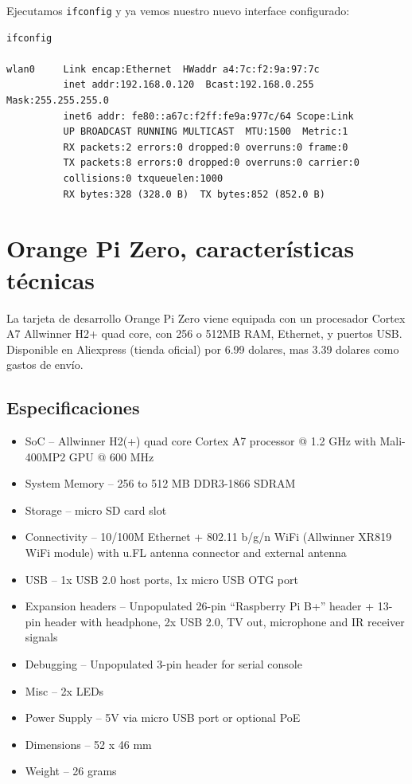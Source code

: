 \documentclass[12pt,spanish,]{scrartcl}
\providecommand{\tightlist}{%
  \setlength{\itemsep}{0pt}\setlength{\parskip}{0pt}}
\begin{document}
Ejecutamos \texttt{ifconfig} y ya vemos nuestro nuevo interface
configurado:

\begin{verbatim}
ifconfig

wlan0     Link encap:Ethernet  HWaddr a4:7c:f2:9a:97:7c
          inet addr:192.168.0.120  Bcast:192.168.0.255  Mask:255.255.255.0
          inet6 addr: fe80::a67c:f2ff:fe9a:977c/64 Scope:Link
          UP BROADCAST RUNNING MULTICAST  MTU:1500  Metric:1
          RX packets:2 errors:0 dropped:0 overruns:0 frame:0
          TX packets:8 errors:0 dropped:0 overruns:0 carrier:0
          collisions:0 txqueuelen:1000
          RX bytes:328 (328.0 B)  TX bytes:852 (852.0 B)
\end{verbatim}

\section{Orange Pi Zero, características
técnicas}\label{orange-pi-zero-caracteruxedsticas-tuxe9cnicas}

La tarjeta de desarrollo Orange Pi Zero viene equipada con un procesador
Cortex A7 Allwinner H2+ quad core, con 256 o 512MB RAM, Ethernet, y
puertos USB. Disponible en Aliexpress (tienda oficial) por 6.99 dolares,
mas 3.39 dolares como gastos de envío.

\subsection{Especificaciones}\label{especificaciones}

\begin{itemize}
\tightlist
\item
  SoC -- Allwinner H2(+) quad core Cortex A7 processor @ 1.2 GHz with
  Mali-400MP2 GPU @ 600 MHz
\item
  System Memory -- 256 to 512 MB DDR3-1866 SDRAM
\item
  Storage -- micro SD card slot
\item
  Connectivity -- 10/100M Ethernet + 802.11 b/g/n WiFi (Allwinner XR819
  WiFi module) with u.FL antenna connector and external antenna
\item
  USB -- 1x USB 2.0 host ports, 1x micro USB OTG port
\item
  Expansion headers -- Unpopulated 26-pin ``Raspberry Pi B+'' header +
  13-pin header with headphone, 2x USB 2.0, TV out, microphone and IR
  receiver signals
\item
  Debugging -- Unpopulated 3-pin header for serial console
\item
  Misc -- 2x LEDs
\item
  Power Supply -- 5V via micro USB port or optional PoE
\item
  Dimensions -- 52 x 46 mm
\item
  Weight -- 26 grams
\end{itemize}
\end{document}
